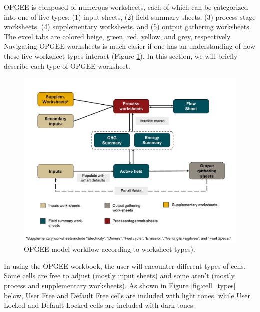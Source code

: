 \documentclass[11pt]{report}
\begin{document}
OPGEE is composed of numerous worksheets, each of which can be categorized into one of five types: (1) input sheets, (2) field summary sheets, (3) process stage worksheets, (4) supplementary worksheets, and (5) output gathering worksheets. The excel tabs are colored beige, green, red, yellow, and grey, respectively. Navigating OPGEE worksheets is much easier if one has an understanding of how these five worksheet types interact (Figure \ref{fig:model_structure}). In this section, we will briefly describe each type of OPGEE worksheet.

\begin{landscape}
\begin{figure}[h]
\includegraphics[width=1\columnwidth]{documentation/images/User_Guide_figs/Fig_3.jpg}
\caption{OPGEE model workflow according to worksheet types).}
\label{fig:model_structure}
\end{figure}
\end{landscape}

In using the OPGEE workbook, the user will encounter different types of cells. Some cells are free to adjust (mostly input sheets) and some aren't (mostly process and supplementary worksheets). As shown in Figure \ref{fig:cell_types} below, User Free and Default Free cells are included with light tones, while User Locked and Default Locked cells are included with dark tones. 
\end{document}
